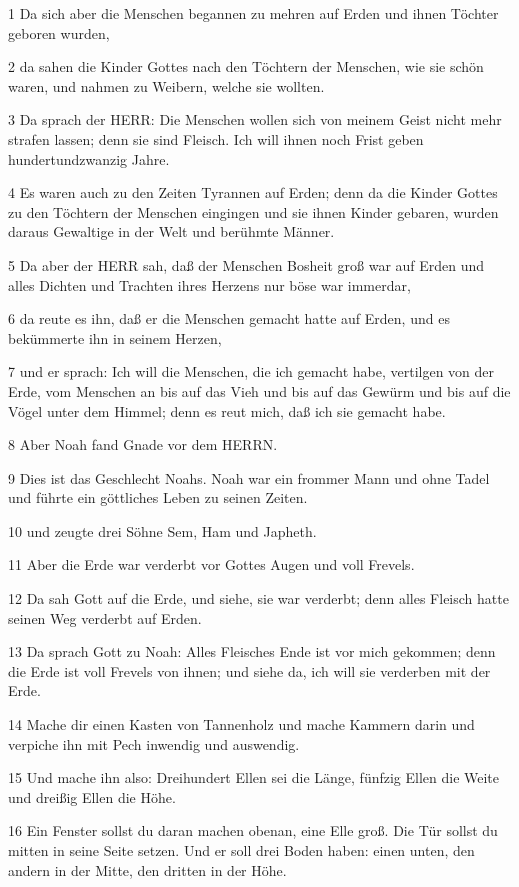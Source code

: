 \par 1 Da sich aber die Menschen begannen zu mehren auf Erden und ihnen Töchter geboren wurden,
\par 2 da sahen die Kinder Gottes nach den Töchtern der Menschen, wie sie schön waren, und nahmen zu Weibern, welche sie wollten.
\par 3 Da sprach der HERR: Die Menschen wollen sich von meinem Geist nicht mehr strafen lassen; denn sie sind Fleisch. Ich will ihnen noch Frist geben hundertundzwanzig Jahre.
\par 4 Es waren auch zu den Zeiten Tyrannen auf Erden; denn da die Kinder Gottes zu den Töchtern der Menschen eingingen und sie ihnen Kinder gebaren, wurden daraus Gewaltige in der Welt und berühmte Männer.
\par 5 Da aber der HERR sah, daß der Menschen Bosheit groß war auf Erden und alles Dichten und Trachten ihres Herzens nur böse war immerdar,
\par 6 da reute es ihn, daß er die Menschen gemacht hatte auf Erden, und es bekümmerte ihn in seinem Herzen,
\par 7 und er sprach: Ich will die Menschen, die ich gemacht habe, vertilgen von der Erde, vom Menschen an bis auf das Vieh und bis auf das Gewürm und bis auf die Vögel unter dem Himmel; denn es reut mich, daß ich sie gemacht habe.
\par 8 Aber Noah fand Gnade vor dem HERRN.
\par 9 Dies ist das Geschlecht Noahs. Noah war ein frommer Mann und ohne Tadel und führte ein göttliches Leben zu seinen Zeiten.
\par 10 und zeugte drei Söhne Sem, Ham und Japheth.
\par 11 Aber die Erde war verderbt vor Gottes Augen und voll Frevels.
\par 12 Da sah Gott auf die Erde, und siehe, sie war verderbt; denn alles Fleisch hatte seinen Weg verderbt auf Erden.
\par 13 Da sprach Gott zu Noah: Alles Fleisches Ende ist vor mich gekommen; denn die Erde ist voll Frevels von ihnen; und siehe da, ich will sie verderben mit der Erde.
\par 14 Mache dir einen Kasten von Tannenholz und mache Kammern darin und verpiche ihn mit Pech inwendig und auswendig.
\par 15 Und mache ihn also: Dreihundert Ellen sei die Länge, fünfzig Ellen die Weite und dreißig Ellen die Höhe.
\par 16 Ein Fenster sollst du daran machen obenan, eine Elle groß. Die Tür sollst du mitten in seine Seite setzen. Und er soll drei Boden haben: einen unten, den andern in der Mitte, den dritten in der Höhe.
